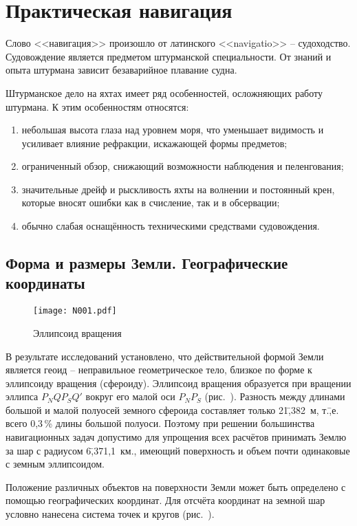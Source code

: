 \twocolumn

\chapter{Практическая навигация\label{chap:6}}

Слово <<навигация>> произошло от латинского <<navigatio>> \---
судоходство. Судовождение является предметом штурманской
специальности. От знаний и опыта штурмана зависит безаварийное
плавание судна.

Штурманское дело на яхтах имеет ряд особенностей, осложняющих работу
штурмана. К этим особенностям относятся:
\begin{enumerate}
\item небольшая высота глаза над уровнем моря, что уменьшает видимость
  и усиливает влияние рефракции, искажающей формы предметов;
\item ограниченный обзор, снижающий возможности наблюдения и
  пеленгования;
\item значительные дрейф и рыскливость яхты на волнении и постоянный
  крен, которые вносят ошибки как в счисление, так и в обсервации;
\item обычно слабая оснащённость техническими средствами судовождения. 
\end{enumerate}

\section{Форма и размеры Земли. Географические координаты} 

\begin{figure}[htb]
  \centering{}
  \texttt{[image: N001.pdf]}
  \caption{Эллипсоид вращения}
  \label{fig:N1}
\end{figure}

В результате исследований установлено, что действительной формой Земли
является геоид \--- неправильное геометрическое тело, близкое по форме
к эллипсоиду вращения (сфероиду). Эллипсоид вращения образуется при
вращении эллипса $P_NQP_SQ'$ вокруг его малой оси $P_NP_S$
(рис.~). Разность между длинами большой и малой полуосей
земного сфероида составляет только 21\=,382~м, т.\=,е. всего 0,3\,\%
длины большой полуоси. Поэтому при решении большинства навигационных
задач допустимо для упрощения всех расчётов принимать Землю за шар с
радиусом 6\=,371,1~км., имеющий поверхность и объем почти одинаковые с
земным эллипсоидом.

Положение различных объектов на поверхности Земли может быть
определено с помощью географических координат. Для отсчёта координат
на земной шар условно нанесена система точек и кругов (рис.~).

